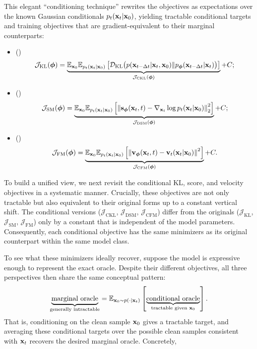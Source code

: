 This elegant ``conditioning technique'' rewrites the objectives as expectations
over the known Gaussian conditionals $p_t({\mathbf{x}}_t | {\mathbf{x}}_0)$, yielding
tractable conditional targets and training objectives that are
gradient-equivalent to their marginal counterparts:
\begin{itemize}
    \item {} ()\textbfs{:}
    \[
    \mathcal{J}_{\text{KL}}(\bm{\phi}) = \underbrace{\mathbb{E}_{{\mathbf{x}}_0} \mathbb{E}_{p_t({\mathbf{x}}_t|{\mathbf{x}}_0)} \left[
        \mathcal{D}_{\mathrm{KL}}\big(p({\mathbf{x}}_{t-\Delta t}|{\mathbf{x}}_t, {\mathbf{x}}_0) \| p_{\bm{\phi}}({\mathbf{x}}_{t-\Delta t}|{\mathbf{x}}_t)\big)
    \right]}_{\mathcal{J}_{\text{CKL}}(\bm{\phi})} + C;
    \]    
    \item {} ()\textbfs{:}
    \[
    \mathcal{J}_{\text{SM}}(\bm{\phi}) = \underbrace{\mathbb{E}_{{\mathbf{x}}_0} \mathbb{E}_{p_t({\mathbf{x}}_t|{\mathbf{x}}_0)} \left[
        \left\| {\mathbf{s}}_{\bm{\phi}}({\mathbf{x}}_t, t) - \nabla_{{\mathbf{x}}_t} \log p_t({\mathbf{x}}_t | {\mathbf{x}}_0) \right\|_2^2
    \right]}_{\mathcal{J}_{\text{DSM}}(\bm{\phi})} + C;
    \]
    \item {} ()\textbfs{:}
    \[
    \mathcal{J}_{\text{FM}}(\bm{\phi}) = \underbrace{\mathbb{E}_{{\mathbf{x}}_0} \mathbb{E}_{p_t({\mathbf{x}}_t|{\mathbf{x}}_0)} \left[
        \left\| {\mathbf{v}}_{\bm{\phi}}({\mathbf{x}}_t, t) - {\mathbf{v}}_t({\mathbf{x}}_t | {\mathbf{x}}_0) \right\|^2
    \right]}_{\mathcal{J}_{\text{CFM}}(\bm{\phi})} + C.
    \]
\end{itemize}
To build a unified view, we next revisit the conditional KL, score, and velocity objectives in a systematic manner. Crucially, these objectives are not only tractable but also equivalent to their original forms up to a constant vertical shift. 
The conditional versions ($\mathcal{J}_{\text{CKL}}$,
$\mathcal{J}_{\text{DSM}}$, $\mathcal{J}_{\text{CFM}}$) differ from the
originals ($\mathcal{J}_{\text{KL}}$, $\mathcal{J}_{\text{SM}}$,
$\mathcal{J}_{\text{FM}}$) only by a constant that is independent of the
model parameters. Consequently, each conditional objective has the same
minimizers as its original counterpart within the same model class.

To see what these minimizers ideally recover, suppose the model is expressive
enough to represent the exact oracle. Despite their different objectives, all
three perspectives then share the same conceptual pattern:
\[
\underbrace{\text{marginal oracle}}_{\text{generally intractable}}
=
\mathbb{E}_{{\mathbf{x}}_0\sim p(\cdot|{\mathbf{x}}_t)}
\left[
\underbrace{\text{conditional oracle}}_{\text{tractable given }{\mathbf{x}}_0}
\right].
\]
That is, conditioning on the clean sample ${\mathbf{x}}_0$ gives a tractable target,
and averaging these conditional targets over the possible clean samples
consistent with ${\mathbf{x}}_t$ recovers the desired marginal oracle. Concretely,

